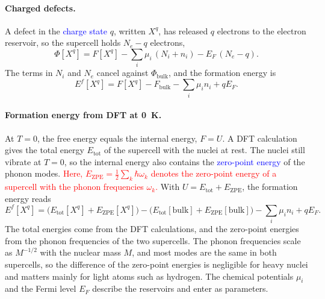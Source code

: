 \paragraph{Charged defects.}
A defect in the \textcolor{blue}{charge state} $q$, written $X^q$, has
released $q$ electrons to the electron reservoir, so the supercell holds
$N_e-q$ electrons,
\begin{equation*}
    \Phi[X^q]=F[X^q]-\sum_i\mu_i\,(N_i+n_i)-E_F\,(N_e-q).
\end{equation*}
The terms in $N_i$ and $N_e$ cancel against $\Phi_{\text{bulk}}$, and the
formation energy is
\begin{equation}
    \boxed{E^f[X^q]=F[X^q]-F_{\text{bulk}}-\sum_i\mu_in_i+qE_F.}
\end{equation}

\paragraph{Formation energy from DFT at 0~K.}
At $T=0$, the free energy equals the internal energy, $F=U$. A DFT
calculation gives the total energy $E_{\text{tot}}$ of the supercell with
the nuclei at rest. The nuclei still vibrate at $T=0$, so the internal energy
also contains the \textcolor{blue}{zero-point energy} of the phonon modes.
\textcolor{red}{Here, $E_{\text{ZPE}}=\frac{1}{2}\sum_k\hbar\omega_k$ denotes
the zero-point energy of a supercell with the phonon frequencies
$\omega_k$.} With $U=E_{\text{tot}}+E_{\text{ZPE}}$, the formation energy
reads
\begin{equation}
    \boxed{E^f[X^q]=\big(E_{\text{tot}}[X^q]+E_{\text{ZPE}}[X^q]\big)
    -\big(E_{\text{tot}}[\text{bulk}]+E_{\text{ZPE}}[\text{bulk}]\big)
    -\sum_i\mu_in_i+qE_F.}
\end{equation}
The total energies come from the DFT calculations, and the zero-point
energies from the phonon frequencies of the two supercells. The phonon
frequencies scale as $M^{-1/2}$ with the nuclear mass $M$, and most modes are
the same in both supercells, so the difference of the zero-point energies is
negligible for heavy nuclei and matters mainly for light atoms such as
hydrogen. The chemical potentials $\mu_i$ and the Fermi level $E_F$ describe
the reservoirs and enter as parameters.
